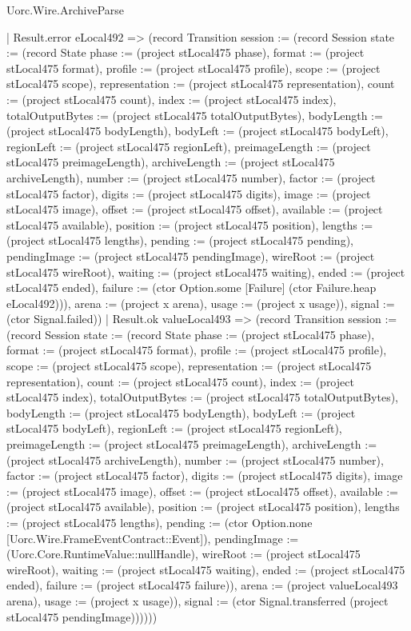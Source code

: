\begin{lexlean}{Uorc.Wire.ArchiveParse}
\begin{semanticmodule}
{            | Result.error eLocal492 => (record Transition {session := (record Session {state := (record State {phase := (project stLocal475 phase), format := (project stLocal475 format), profile := (project stLocal475 profile), scope := (project stLocal475 scope), representation := (project stLocal475 representation), count := (project stLocal475 count), index := (project stLocal475 index), totalOutputBytes := (project stLocal475 totalOutputBytes), bodyLength := (project stLocal475 bodyLength), bodyLeft := (project stLocal475 bodyLeft), regionLeft := (project stLocal475 regionLeft), preimageLength := (project stLocal475 preimageLength), archiveLength := (project stLocal475 archiveLength), number := (project stLocal475 number), factor := (project stLocal475 factor), digits := (project stLocal475 digits), image := (project stLocal475 image), offset := (project stLocal475 offset), available := (project stLocal475 available), position := (project stLocal475 position), lengths := (project stLocal475 lengths), pending := (project stLocal475 pending), pendingImage := (project stLocal475 pendingImage), wireRoot := (project stLocal475 wireRoot), waiting := (project stLocal475 waiting), ended := (project stLocal475 ended), failure := (ctor Option.some [Failure] (ctor Failure.heap eLocal492))}), arena := (project x arena), usage := (project x usage)}), signal := (ctor Signal.failed)})
            | Result.ok valueLocal493 => (record Transition {session := (record Session {state := (record State {phase := (project stLocal475 phase), format := (project stLocal475 format), profile := (project stLocal475 profile), scope := (project stLocal475 scope), representation := (project stLocal475 representation), count := (project stLocal475 count), index := (project stLocal475 index), totalOutputBytes := (project stLocal475 totalOutputBytes), bodyLength := (project stLocal475 bodyLength), bodyLeft := (project stLocal475 bodyLeft), regionLeft := (project stLocal475 regionLeft), preimageLength := (project stLocal475 preimageLength), archiveLength := (project stLocal475 archiveLength), number := (project stLocal475 number), factor := (project stLocal475 factor), digits := (project stLocal475 digits), image := (project stLocal475 image), offset := (project stLocal475 offset), available := (project stLocal475 available), position := (project stLocal475 position), lengths := (project stLocal475 lengths), pending := (ctor Option.none [Uorc.Wire.FrameEventContract::Event]), pendingImage := (Uorc.Core.RuntimeValue::nullHandle), wireRoot := (project stLocal475 wireRoot), waiting := (project stLocal475 waiting), ended := (project stLocal475 ended), failure := (project stLocal475 failure)}), arena := (project valueLocal493 arena), usage := (project x usage)}), signal := (ctor Signal.transferred (project stLocal475 pendingImage))}))))
}
\end{semanticmodule}
\end{lexlean}
